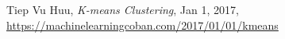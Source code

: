 \begin{thebibliography}{9}

	Tiep Vu Huu,
	\textit{K-means Clustering}, Jan 1, 2017,
	\url{https://machinelearningcoban.com/2017/01/01/kmeans}

\end{thebibliography}
